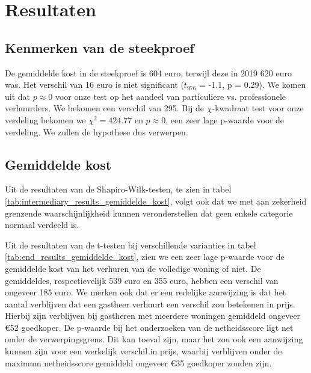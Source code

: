 \documentclass[a4paper]{kulakarticle}
\begin{document}
	
	\section{Resultaten}
	
	\subsection{Kenmerken van de steekproef}
	De gemiddelde kost in de steekproef is 604 euro, terwijl deze in 2019 620 euro was. Het verschil van 16 euro is niet significant ($t_{976}$ = -1.1, p = 0.29). We komen uit dat $p \approx 0$ voor onze test op het aandeel van particuliere vs. professionele verhuurders. We bekomen een verschil van 295. Bij de $\chi$-kwadraat test voor onze verdeling bekomen we $\chi^2 = 424.77$ en $p \approx 0$, een zeer lage p-waarde voor de verdeling. We zullen de hypothese dus verwerpen.
	
	\subsection{Gemiddelde kost}
	 Uit de resultaten van de Shapiro-Wilk-testen, te zien in tabel \ref{tab:intermediary_results_gemiddelde_kost}, volgt ook dat we met aan zekerheid grenzende waarschijnlijkheid kunnen veronderstellen dat geen enkele categorie normaal verdeeld is.
	
	Uit de resultaten van de t-testen bij verschillende varianties in tabel \ref{tab:end_results_gemiddelde_kost}, zien we een zeer lage p-waarde voor de gemiddelde kost van het verhuren van de volledige woning of niet. De gemiddeldes, respectievelijk 539 euro en 355 euro, hebben een verschil van ongeveer 185 euro. We merken ook dat er een redelijke aanwijzing is dat het aantal verblijven dat een gastheer verhuurt een verschil zou betekenen in prijs. Hierbij zijn verblijven bij gastheren met meerdere woningen gemiddeld ongeveer €52 goedkoper.
	De p-waarde bij het onderzoeken van de netheidsscore ligt net onder de verwerpingsgrens. Dit kan toeval zijn, maar het zou ook een aanwijzing kunnen zijn voor een werkelijk verschil in prijs, waarbij verblijven onder de maximum netheidsscore gemiddeld ongeveer €35 goedkoper zouden zijn.
	
\end{document}
